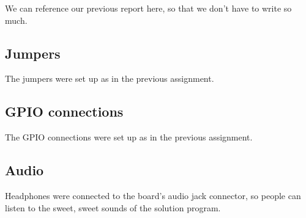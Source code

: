 We can reference our previous report here, so that we don't have to write so much.

\subsection{Jumpers}

The jumpers were set up as in the previous assignment.\cite{tdt4258-1}

\subsection{GPIO connections}

The GPIO connections were set up as in the previous assignment.\cite{tdt4258-1}

\subsection{Audio}

Headphones were connected to the board's audio jack connector, so people can listen to the sweet, sweet sounds of the solution program.
